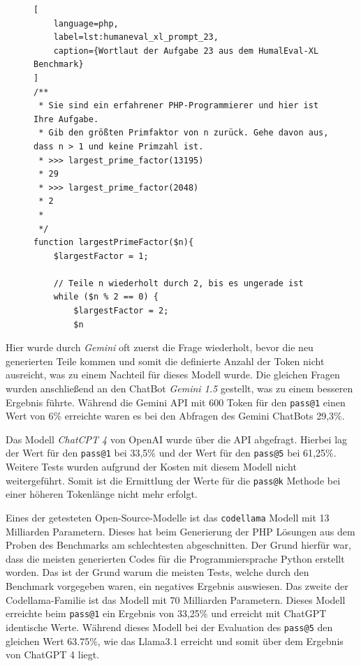 \begin{figure}[!ht]
\begin{lstlisting}[
	language=php,
	label=lst:humaneval_xl_prompt_23,
	caption={Wortlaut der Aufgabe 23 aus dem HumalEval-XL Benchmark}
]
/**
 * Sie sind ein erfahrener PHP-Programmierer und hier ist Ihre Aufgabe.
 * Gib den größten Primfaktor von n zurück. Gehe davon aus, dass n > 1 und keine Primzahl ist.
 * >>> largest_prime_factor(13195)
 * 29
 * >>> largest_prime_factor(2048)
 * 2
 *
 */
function largestPrimeFactor($n){
    $largestFactor = 1;

    // Teile n wiederholt durch 2, bis es ungerade ist
    while ($n % 2 == 0) {
        $largestFactor = 2;
        $n
\end{lstlisting}
\end{figure}

Hier wurde durch \textit{Gemini} oft zuerst die Frage wiederholt, bevor die neu generierten Teile kommen und somit die definierte Anzahl der Token nicht ausreicht, was zu einem Nachteil für dieses Modell wurde. Die gleichen Fragen wurden anschließend an den ChatBot \textit{Gemini 1.5} gestellt, was zu einem besseren Ergebnis führte. Während die Gemini API mit 600 Token für den \texttt{pass@1} einen Wert von 6\% erreichte waren es bei den Abfragen des Gemini ChatBots 29,3\%.\vspace{0.2cm}

Das Modell \textit{ChatCPT 4} von OpenAI wurde über die API abgefragt. Hierbei lag der Wert für den \texttt{pass@1} bei 33,5\% und der Wert für den \texttt{pass@5} bei 61,25\%. Weitere Tests wurden aufgrund der Kosten mit diesem Modell nicht weitergeführt. Somit ist die Ermittlung der Werte für die \texttt{pass@k} Methode bei einer höheren Tokenlänge nicht mehr erfolgt.\vspace{0.2cm}

Eines der getesteten Open-Source-Modelle ist das \texttt{codellama} Modell mit 13 Milliarden Parametern. Dieses hat beim Generierung der PHP Lösungen aus dem Proben des Benchmarks am schlechtesten abgeschnitten. Der Grund hierfür war, dass die meisten generierten Codes für die Programmiersprache Python erstellt worden. Das ist der Grund warum die meisten Tests, welche durch den Benchmark vorgegeben waren, ein negatives Ergebnis auswiesen. Das zweite der Codellama-Familie ist das Modell mit 70 Milliarden Parametern. Dieses Modell erreichte beim \texttt{pass@1} ein Ergebnis von 33,25\% und erreicht mit ChatGPT identische Werte. Während dieses Modell bei der Evaluation des \texttt{pass@5} den gleichen Wert 63.75\%, wie das Llama3.1 erreicht und somit über dem Ergebnis von ChatGPT 4 liegt.\vspace{0.2cm}


